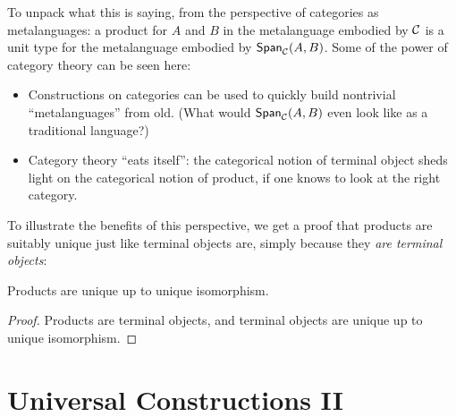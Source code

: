 To unpack what this is saying, from the perspective of categories as metalanguages:
a product for \(A\) and \(B\) in the metalanguage embodied
by \(\mathcal C\) is a unit type for the metalanguage
embodied by \(\mathsf{Span}_\mathcal C(A,B)\).
Some of the power of category theory can be seen here:
\begin{itemize}
\item Constructions on categories can be used to quickly build
  nontrivial ``metalanguages'' from old.
  (What would \(\mathsf{Span}_\mathcal C(A,B)\) even look like as a traditional language?)
\item Category theory ``eats itself'': the categorical notion of terminal object
  sheds light on the categorical notion of product, if one knows to look at
  the right category.
\end{itemize}
To illustrate the benefits of this perspective,
we get a proof that products are suitably unique
just like terminal objects are, simply because they \emph{are terminal objects}:
\begin{proposition}
  Products are unique up to unique isomorphism.
\end{proposition}
\begin{proof}
  Products are terminal objects,
  and terminal objects are unique up to unique isomorphism.
\end{proof}



\chapter{Universal Constructions II}

